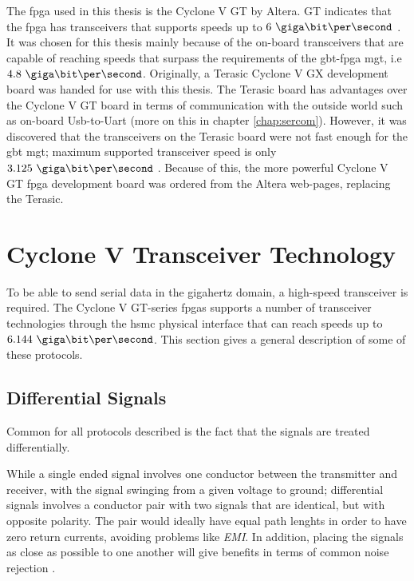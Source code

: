 \documentclass[main.tex]{subfiles}
\begin{document}
The \gls{fpga} used in this thesis is the Cyclone V GT by Altera. GT indicates that the \gls{fpga} has transceivers that supports speeds up to $6~\giga\bit\per\second$ \cite{altera_cvoverview15}. It was chosen for this thesis mainly because of the on-board transceivers that are capable of reaching speeds that surpass the requirements of the \gls{gbt}-\gls{fpga} \gls{mgt}, i.e $4.8~\giga\bit\per\second$. Originally, a Terasic Cyclone V GX development board was handed for use with this thesis. The Terasic board has advantages over the Cyclone V GT board in terms of communication with the outside world such as on-board Usb-to-Uart (more on this  in chapter \ref{chap:sercom}). However, it was discovered that the transceivers on the Terasic board were not fast enough for the \gls{gbt} \gls{mgt}; maximum supported transceiver speed is only $3.125~\giga\bit\per\second$ \cite{altera_cvoverview15}. Because of this, the more powerful Cyclone V GT \gls{fpga} development board was ordered from the Altera web-pages, replacing the Terasic.

\section{Cyclone V Transceiver Technology}

To be able to send serial data in the gigahertz domain, a high-speed transceiver is required. The Cyclone V GT-series \glspl{fpga} supports a number of transceiver technologies through the \gls{hsmc} physical interface that can reach speeds up to $6.144\ \giga\bit\per\second$. This section gives a general description of some of these protocols.

\subsection{Differential Signals} \label{subsec:diffsig}

Common for all protocols described is the fact that the signals are treated differentially. 

While a single ended signal involves one conductor between the transmitter and receiver, with the signal swinging from a given voltage to ground; differential signals involves a conductor pair with two signals that are identical, but with opposite polarity. The pair would ideally have equal path lenghts in order to have zero return currents, avoiding problems like \textit{EMI}. In addition, placing the signals as close as possible to one another will give benefits in terms of common noise rejection \cite{douglas01}.\\
\end{document}
